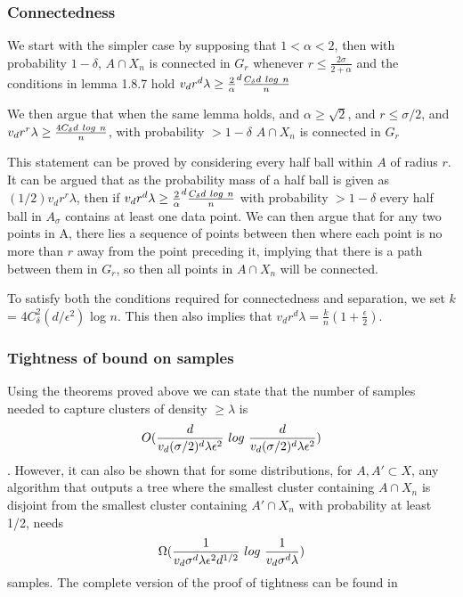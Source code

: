 \subsubsection{Connectedness}

We start with the simpler case by supposing that $1 < \alpha < 2$, then with probability $1 - \delta$, $A \cap X_n$ is connected in $G_r$ whenever $r \leq \frac{2\sigma}{2+ \alpha}$ and the conditions in lemma 1.8.7 hold $v_dr^d\lambda \geq \frac{2}{\alpha}^d\frac{C_{\delta} d \-\ log \-\ n}{n}$

We then argue that when the same lemma holds, and $\alpha \geq \sqrt{2}$, and $r \leq \sigma/2$, and $v_dr^r\lambda \geq \frac{4C_{\delta}d \-\ log \-\ n}{n}$, with probability $> 1- \delta$ $A\cap X_n$ is connected in $G_r$

This statement can be proved by considering every half ball within $A$ of radius $r$.  It can be argued that as the probability mass of a half ball is given as $(1/2)v_dr^r\lambda$, then if $v_dr^d\lambda \geq \frac{2}{\alpha}^d\frac{C_{\delta} d \-\ log \-\ n}{n}$ with probability $> 1 - \delta$ every half ball in $A_{\sigma}$ contains at least one data point.  We can then argue that for any two points in A, there lies a sequence of points between then where each point is no more than $r$ away from the point preceding it, implying that there is a path between them in $G_r$, so then all points in $A \cap X_n$ will be connected.

To satisfy both the conditions required for connectedness and separation, we set $k$ = 4$C_{\delta}^2(d/\epsilon^2)$ log $n$.  This then also implies that $v_dr^d\lambda  = \frac{k}{n}(1+\frac{\epsilon}{2})$.

\subsubsection{Tightness of bound on samples}
Using the theorems proved above we can state that the number of samples needed to capture clusters of density $\geq \lambda$ is $$O(\frac{d}{v_d(\sigma/2)^d\lambda\epsilon^2} \-\ log \-\ \frac{d}{v_d(\sigma/2)^d\lambda\epsilon^2})$$.  However, it can also be shown that for some distributions, for  $A, A' \subset X$, any algorithm that outputs a tree where the smallest cluster containing $A \cap X_n$ is disjoint from the smallest cluster containing $A' \cap X_n$ with probability at least 1/2, needs $$\Omega(\frac{1}{v_d\sigma^d\lambda\epsilon^2d^{1/2}} \-\ log \-\ \frac{1}{v_d\sigma^d\lambda})$$ samples.  The complete version of the proof of tightness can be found in \cite{SD}


